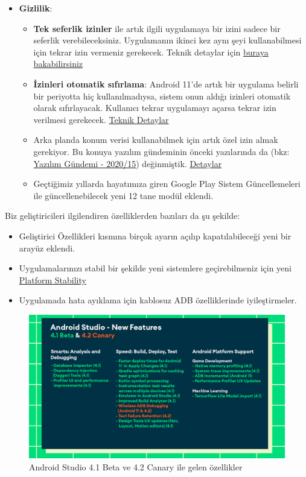 \documentclass[11pt]{article}
\begin{document}
\begin{itemize}
\item \textbf{Gizlilik}:
\begin{itemize}
\item \textbf{Tek seferlik izinler} ile artık ilgili uygulamaya bir izini sadece bir
seferlik verebileceksiniz. Uygulamanın ikinci kez aynı şeyi
kullanabilmesi için tekrar izin vermeniz gerekecek. Teknik detaylar için
\href{https://developer.android.com/preview/privacy/permissions}{buraya bakabilirsiniz}
\item \textbf{İzinleri otomatik sıfırlama}: Android 11'de artık bir uygulama belirli
bir periyotta hiç kullanılmadıysa, sistem onun aldığı izinleri otomatik
olarak sıfırlayacak. Kullanıcı tekrar uygulamayı açarsa tekrar izin
verilmesi gerekecek. \href{https://developer.android.com/preview/privacy/permissions\#auto-reset}{Teknik Detaylar}
\item Arka planda konum verisi kullanabilmek için artık özel izin almak
gerekiyor. Bu konuya yazılım gündeminin önceki yazılarında da (bkz:
\href{../15/yazilim-gundemi-2020-15.pdf}{Yazılım Gündemi - 2020/15}) değinmiştik. \href{https://support.google.com/googleplay/android-developer/answer/9799150}{Detaylar}
\item Geçtiğimiz yıllarda hayatımıza giren Google Play Sistem Güncellemeleri ile
güncellenebilecek yeni 12 tane modül eklendi.
\end{itemize}
\end{itemize}

Biz geliştiricileri ilgilendiren özelliklerden bazıları da şu şekilde:

\begin{itemize}
\item Geliştirici Özellikleri kısmına birçok ayarın açılıp kapatılabileceği yeni
bir arayüz eklendi.
\item Uygulamalarınızı stabil bir şekilde yeni sistemlere geçirebilmeniz için
yeni \href{https://developer.android.com/preview/overview\#timeline}{Platform Stability}
\item Uygulamada hata ayıklama için kablosuz ADB özelliklerinde iyileştirmeler.
\end{itemize}

\begin{figure}[htbp]
\centering
\includegraphics[width=.9\linewidth]{gorseller/android-studio.jpg}
\caption{Android Studio 4.1 Beta ve 4.2 Canary ile gelen özellikler}
\end{figure}
\end{document}
